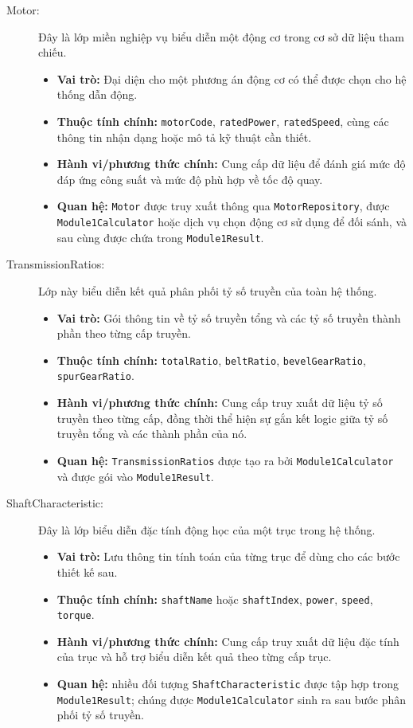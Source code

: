 \documentclass[a4paper]{article}
\begin{document}
\begin{description}
    \item[Motor:]
    Đây là lớp miền nghiệp vụ biểu diễn một động cơ trong cơ sở dữ liệu tham chiếu.
    \begin{itemize}
        \item \textbf{Vai trò:} Đại diện cho một phương án động cơ có thể được chọn cho hệ thống dẫn động.
        \item \textbf{Thuộc tính chính:} \texttt{motorCode}, \texttt{ratedPower}, \texttt{ratedSpeed}, cùng các thông tin nhận dạng hoặc mô tả kỹ thuật cần thiết.
        \item \textbf{Hành vi/phương thức chính:} Cung cấp dữ liệu để đánh giá mức độ đáp ứng công suất và mức độ phù hợp về tốc độ quay.
        \item \textbf{Quan hệ:} \texttt{Motor} được truy xuất thông qua \texttt{MotorRepository}, được \texttt{Module1Calculator} hoặc dịch vụ chọn động cơ sử dụng để đối sánh, và sau cùng được chứa trong \texttt{Module1Result}.
    \end{itemize}

    \item[TransmissionRatios:]
    Lớp này biểu diễn kết quả phân phối tỷ số truyền của toàn hệ thống.
    \begin{itemize}
        \item \textbf{Vai trò:} Gói thông tin về tỷ số truyền tổng và các tỷ số truyền thành phần theo từng cấp truyền.
        \item \textbf{Thuộc tính chính:} \texttt{totalRatio}, \texttt{beltRatio}, \texttt{bevelGearRatio}, \texttt{spurGearRatio}.
        \item \textbf{Hành vi/phương thức chính:} Cung cấp truy xuất dữ liệu tỷ số truyền theo từng cấp, đồng thời thể hiện sự gắn kết logic giữa tỷ số truyền tổng và các thành phần của nó.
        \item \textbf{Quan hệ:} \texttt{TransmissionRatios} được tạo ra bởi \texttt{Module1Calculator} và được gói vào \texttt{Module1Result}.
    \end{itemize}

    \item[ShaftCharacteristic:]
    Đây là lớp biểu diễn đặc tính động học của một trục trong hệ thống.
    \begin{itemize}
        \item \textbf{Vai trò:} Lưu thông tin tính toán của từng trục để dùng cho các bước thiết kế sau.
        \item \textbf{Thuộc tính chính:} \texttt{shaftName} hoặc \texttt{shaftIndex}, \texttt{power}, \texttt{speed}, \texttt{torque}.
        \item \textbf{Hành vi/phương thức chính:} Cung cấp truy xuất dữ liệu đặc tính của trục và hỗ trợ biểu diễn kết quả theo từng cấp trục.
        \item \textbf{Quan hệ:} nhiều đối tượng \texttt{ShaftCharacteristic} được tập hợp trong \texttt{Module1Result}; chúng được \texttt{Module1Calculator} sinh ra sau bước phân phối tỷ số truyền.
    \end{itemize}


\end{description}
\end{document}
